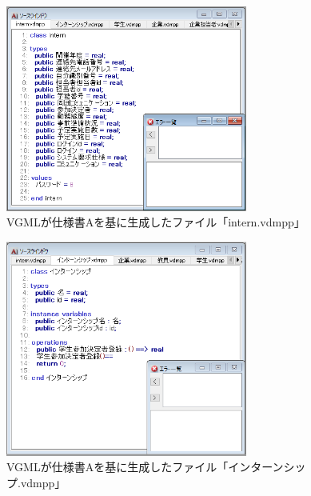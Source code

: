 \begin{figure}[p]
    \begin{center}
    \includegraphics[width=300]{image/indication_vdm1.PNG}
    \caption{VGMLが仕様書Aを基に生成したファイル「intern.vdmpp」}
    \label{fig:indication_vdm1}
    \end{center}
\end{figure}

\begin{figure}[p]
    \begin{center}
    \includegraphics[width=300]{image/indication_vdm2.PNG}
    \caption{VGMLが仕様書Aを基に生成したファイル「インターンシップ.vdmpp」}
    \label{fig:indication_vdm2}
    \end{center}
\end{figure}

